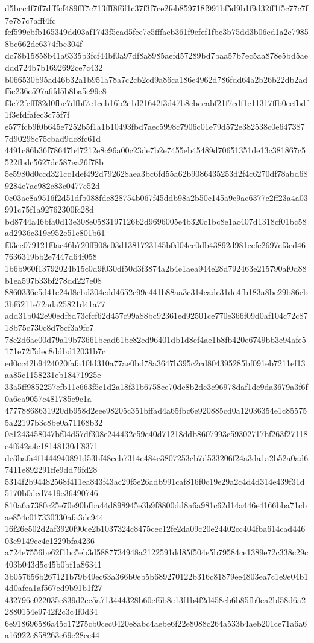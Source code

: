 {d5bcc4f7ff7dfffcf489fff7c713fff8f6f1c37f3f7ce2feb859718f991bf5d9b1f9d32ff1f5c77c7f7e787c7afff4fc
fcf599cbfb165349dd03af1743f5cad5fee7c5fffacb361f9efef1fbc3b75dd3b06ed1a2e79858bc662de6374fbc304f
dc78b15858b41a6335b3fcf44bf0a97df8a8985aefd57289bd7baa57b7ec5aa878e5bd5aeddd724b7b1692692ce7c432
b066530b95ad46b32a1b951a78a7c2cb2cd9a86ca186e4962d786fdd64a2b26b22db2adf5e236e597a6fd5b8ba5e99e8
f3c72fefff82d0fbc7dfbf7e1ceb16b2e1d21642f3d47b8cbceabf21f7edf1e11317ffb0eefbdf1f3efdfafec3c75f7f
e577fcb9f0b645e7252b5f1a1b10493fbd7aec5998c7906c01e79d572e382538c0e6473877d90298c75cbad9dc8fc61d
4491c86b36f78647b47212e8c96a00c23de7b2e7455eb45489d70651351de13c381867c5522fbdc5627dc587ea26f78b
5e5980d0ccd321cc1def492d792628aea3bc6fd55a62b9086435253d2f4c6270df78abd689284e7ac982c83c0477c52d
0c03ae8a9516f2d51dfb088fde828754b067f45ddb98a2b50c145a9c9ac6377c2ff23a4a03991c75f1a92762300fc28d
bd8744a46bfa0d13e308e0583197126b2d9696005e4b320c1bc8e1ac407d1318cf01bc58ad2936c319c952e51e801b61
f03cc079121f0ac46b720ff908e03d1381723145b0d04ee0db43892d981ccfe2697cf3ed467636319bb2e7447d64f058
1b6b960f13792024b15c0d9f030df50d3f3874a2b4e1aea944e28d792463e215790af0d88b1ea597b33bf278dd227e08
8860336e5d41e24d8ebd304edd4652c99e441b88aa3c314cadc31de4fb183a8bc29b86eb3bf6211e72ada25821d41a77
add31b042e90edf8d73cfcf62d457c99a88bc92361ed92501ce770e366f09d0af104c72c8718b75c730c8d78cf3a9fc7
78e2d6ae00d79a19b73661bcad61bc82ed96401db1d8ef4ae1b8fb420e6749bb3e94afe5171e72f5dec8ddbd12031b7c
ed0cc42b9424020fafa1f4d310a77ae0bd78a3647b395c2cd804395285bf091eb7211ef13aa85c1158231eb18471925e
33a5ff9852257efb11c663f5c1d2a18f31b6758ce70dc8b2dc3c96978daf1de9da3679a3f6f0a6ea9057c481785e9c1a
47778868631920db958d2eee98205c351bffad4a65fbc6e920885cd0a12036354e1c855755a22197b3c8be0a71168b32
0c1243458047bf04d57df308e244432c59e40d71218ddb8607993c59302717bf263f27118e4f642a4c18148130df8371
de3bafa4f1444940891d53bf48ccb7314e484e3807253cb7d533206f24a3da1a2b52a0ad67411e892291ffe9dd76fd28
5314f2b94482568f411ea843f43ac29f5e26adb991caf816f0c19e29a2c4d4d314e439f31d5170b0dcd7419e36490746
810a6a7380c25e70e90bfba44d898945e3b9f8800dd8a6a981c62d14a446e4166bba71cbae854c017330330afa3dc944
16f26e502d2af3920f90ce2b1037324c8475cec12fe2da09c20e24402cc404fba614cad44603e9149cc4e1229bfa4236
a724e7556be62f1bc5eb3d5887734948a2122591dd85f504e5b79584ce1389e72c338c29c403b043d5c45b0bf1a86341
3b057656b267121b79b49ec63a366b0eb5b689270122b316c81879ee4803ea7c1e9e04b14d0afea1af567ed9b91b1f27
432796e022035e839d2cc5a713444328b60ef6b8c13f1b4f2d458cb6b85fb0ea2bf58d6a22880154e9742f2c3c4f0d34
6e918696586a45c17275cb0cec0420e8abc4aebe6f22e8088c264a533b4aeb201ce71a6a6a16922e858263e69e28cc44
}

